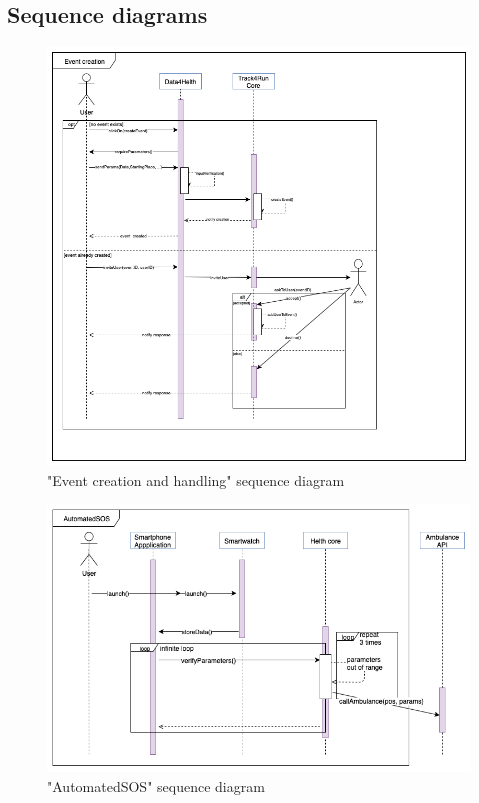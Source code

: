 \documentclass{article}
\begin{document}
\subsection{Sequence diagrams}
\begin{figure}[h!]
  \includegraphics[width=\textwidth]{Figures/Sequence-Event}
    \caption{"Event creation and handling" sequence diagram}
\end{figure}
\begin{figure}[h!]
  \includegraphics[width=\textwidth]{Figures/Sequence-AtomatedSOS}
  \caption{"AutomatedSOS" sequence diagram}
\end{figure}
\end{document}
